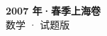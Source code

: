 \documentclass[zihao=-4, a4paper]{ctexart}
\begin{document}
\begin{center}
  {\Large\bfseries 2007 年·春季上海卷}\\[4pt]
  {\large 数学 · 试题版}
\end{center}
\medskip
{}

\end{document}
